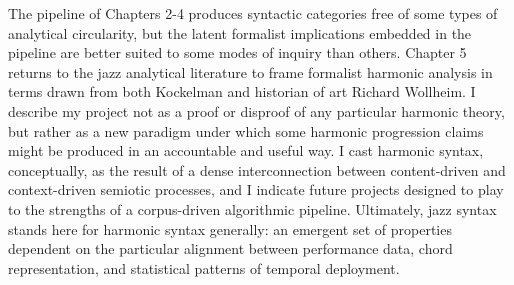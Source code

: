 The pipeline of Chapters 2-4 produces syntactic categories free of some types of analytical circularity, but the latent formalist implications embedded in the pipeline are better suited to some modes of inquiry than others.  Chapter 5 returns to the jazz analytical literature to frame formalist harmonic analysis in terms drawn from both Kockelman and historian of art Richard Wollheim.  I describe my project not as a proof or disproof of any particular harmonic theory, but rather as a new paradigm under which some harmonic progression claims might be produced in an accountable and useful way.  I cast harmonic syntax, conceptually, as the result of a dense interconnection between content-driven and context-driven semiotic processes, and I indicate future projects designed to play to the strengths of a corpus-driven algorithmic pipeline.  Ultimately, jazz syntax stands here for harmonic syntax generally: an emergent set of properties dependent on the particular alignment between performance data, chord representation, and statistical patterns of temporal deployment.

